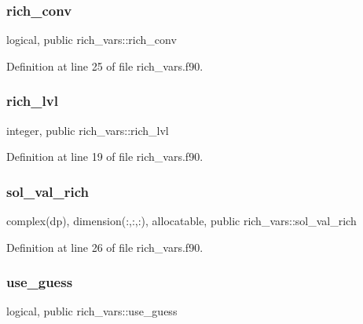 \subsubsection{\texorpdfstring{rich\+\_\+conv}{rich\_conv}}
{\footnotesize\ttfamily logical, public rich\+\_\+vars\+::rich\+\_\+conv}



Definition at line 25 of file rich\+\_\+vars.\+f90.

\mbox{\label{namespacerich__vars_a1b7734ba9ce6cc153b22387e638093c0}} 
\subsubsection{\texorpdfstring{rich\+\_\+lvl}{rich\_lvl}}
{\footnotesize\ttfamily integer, public rich\+\_\+vars\+::rich\+\_\+lvl}



Definition at line 19 of file rich\+\_\+vars.\+f90.

\mbox{\label{namespacerich__vars_ae1d3c7deb4c8becd036a63367fca5e20}} 
\subsubsection{\texorpdfstring{sol\+\_\+val\+\_\+rich}{sol\_val\_rich}}
{\footnotesize\ttfamily complex(dp), dimension(\+:,\+:,\+:), allocatable, public rich\+\_\+vars\+::sol\+\_\+val\+\_\+rich}



Definition at line 26 of file rich\+\_\+vars.\+f90.

\mbox{\label{namespacerich__vars_aedc7171560db899c515d1610d99582c9}} 
\subsubsection{\texorpdfstring{use\+\_\+guess}{use\_guess}}
{\footnotesize\ttfamily logical, public rich\+\_\+vars\+::use\+\_\+guess}



